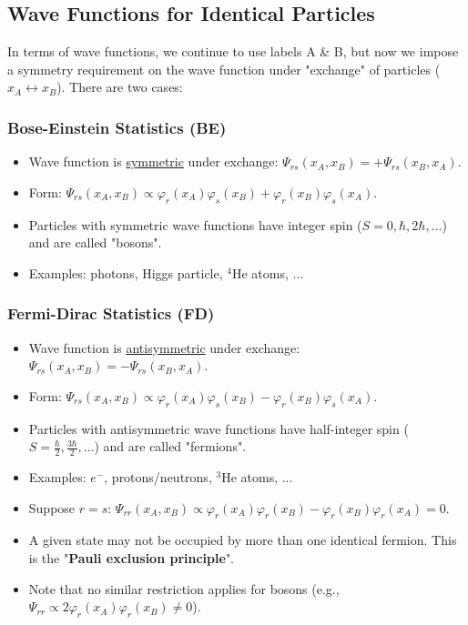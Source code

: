 \documentclass[11pt]{article}
\begin{document}
\subsection*{Wave Functions for Identical Particles}

In terms of wave functions, we continue to use labels A \& B, but now we impose a symmetry requirement on the wave function under "exchange" of particles ($x_A \leftrightarrow x_B$). There are two cases:

\subsubsection*{Bose-Einstein Statistics (BE)}
\begin{itemize}
    \item Wave function is \uline{symmetric} under exchange: $\Psi_{rs}(x_A, x_B) = +\Psi_{rs}(x_B, x_A)$.
    \item Form: $\Psi_{rs}(x_A, x_B) \propto \varphi_r(x_A) \varphi_s(x_B) + \varphi_r(x_B) \varphi_s(x_A)$.
    \item Particles with symmetric wave functions have integer spin ($S=0, \hbar, 2\hbar, \dots$) and are called "bosons".
    \item Examples: photons, Higgs particle, $^4$He atoms, ...
\end{itemize}

\subsubsection*{Fermi-Dirac Statistics (FD)}
\begin{itemize}
    \item Wave function is \uline{antisymmetric} under exchange: $\Psi_{rs}(x_A, x_B) = -\Psi_{rs}(x_B, x_A)$.
    \item Form: $\Psi_{rs}(x_A, x_B) \propto \varphi_r(x_A) \varphi_s(x_B) - \varphi_r(x_B) \varphi_s(x_A)$.
    \item Particles with antisymmetric wave functions have half-integer spin ($S=\frac{\hbar}{2}, \frac{3\hbar}{2}, \dots$) and are called "fermions".
    \item Examples: $e^-$, protons/neutrons, $^3$He atoms, ...
    \item Suppose $r=s$: $\Psi_{rr}(x_A, x_B) \propto \varphi_r(x_A) \varphi_r(x_B) - \varphi_r(x_B) \varphi_r(x_A) = 0$.
    \item A given state may not be occupied by more than one identical fermion. This is the "\textbf{Pauli exclusion principle}".
    \item Note that no similar restriction applies for bosons (e.g., $\Psi_{rr} \propto 2\varphi_r(x_A)\varphi_r(x_B) \neq 0$).
\end{itemize}
\end{document}
